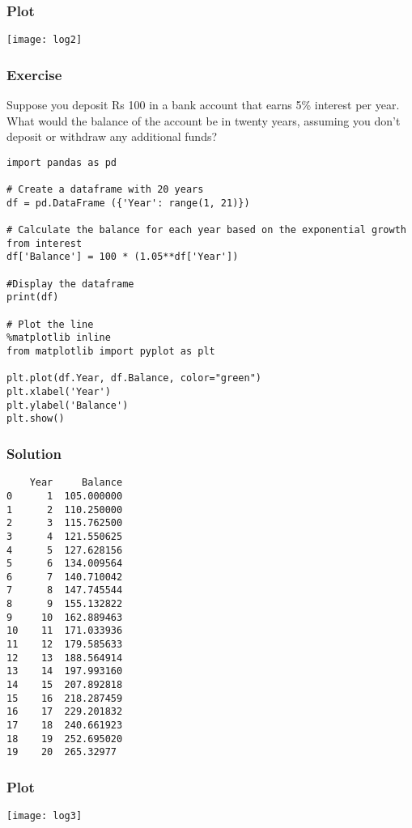  \begin{frame}[fragile]\frametitle{Plot}
\begin{center}
\texttt{[image: log2]}
\end{center}
\end{frame}


 \begin{frame}[fragile]\frametitle{Exercise}
Suppose you deposit Rs 100 in a bank account that earns 5\% interest per year. What would the balance of the account be in twenty years, assuming you don't deposit or withdraw any additional funds?

\begin{lstlisting}
import pandas as pd

# Create a dataframe with 20 years
df = pd.DataFrame ({'Year': range(1, 21)})

# Calculate the balance for each year based on the exponential growth from interest
df['Balance'] = 100 * (1.05**df['Year'])

#Display the dataframe
print(df)

# Plot the line
%matplotlib inline
from matplotlib import pyplot as plt

plt.plot(df.Year, df.Balance, color="green")
plt.xlabel('Year')
plt.ylabel('Balance')
plt.show()
\end{lstlisting}
\end{frame}

 \begin{frame}[fragile]\frametitle{Solution}
\begin{lstlisting}
    Year     Balance
0      1  105.000000
1      2  110.250000
2      3  115.762500
3      4  121.550625
4      5  127.628156
5      6  134.009564
6      7  140.710042
7      8  147.745544
8      9  155.132822
9     10  162.889463
10    11  171.033936
11    12  179.585633
12    13  188.564914
13    14  197.993160
14    15  207.892818
15    16  218.287459
16    17  229.201832
17    18  240.661923
18    19  252.695020
19    20  265.32977
\end{lstlisting}
\end{frame}

 \begin{frame}[fragile]\frametitle{Plot}
\begin{center}
\texttt{[image: log3]}
\end{center}
\end{frame}

